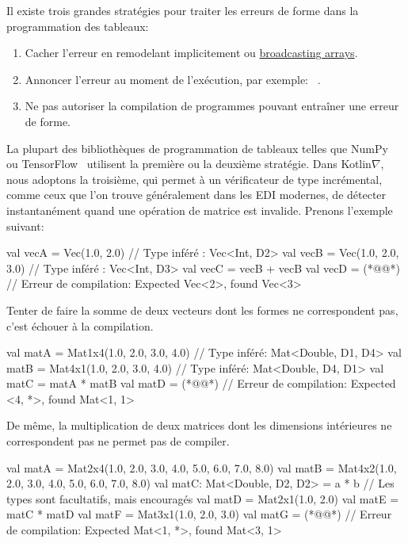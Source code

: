 \noindent Il existe trois grandes stratégies pour traiter les erreurs de forme dans la programmation des tableaux:
%
\begin{enumerate}
    \item Cacher l'erreur en remodelant implicitement ou \href{https://docs.scipy.org/doc/numpy-1.15.0/user/basics.broadcasting.html}{broadcasting arrays}.
    \item Annoncer l'erreur au moment de l'exécution, par exemple: ~\href{https://www.tensorflow.org/api_docs/python/tf/errors/InvalidArgumentError}{}.
    \item Ne pas autoriser la compilation de programmes pouvant entraîner une erreur de forme. \\
\end{enumerate}
%
La plupart des bibliothèques de programmation de tableaux telles que NumPy~\citep{van2011numpy} ou TensorFlow~\citep{abadi2016tensorflow} utilisent la première ou la deuxième stratégie. Dans Kotlin$\nabla$, nous adoptons la troisième, qui permet à un vérificateur de type incrémental, comme ceux que l'on trouve généralement dans les EDI modernes, de détecter instantanément quand une opération de matrice est invalide. Prenons l'exemple suivant:
%
\begin{kotlinlisting}
val vecA = Vec(1.0, 2.0)      // Type inféré : Vec<Int, D2>
val vecB = Vec(1.0, 2.0, 3.0) // Type inféré : Vec<Int, D3>
val vecC = vecB + vecB
val vecD = (*@@*) // Erreur de compilation: Expected Vec<2>, found Vec<3>
\end{kotlinlisting}
%
Tenter de faire la somme de deux vecteurs dont les formes ne correspondent pas, c'est échouer à la compilation.
%
\begin{kotlinlisting}
val matA = Mat1x4(1.0, 2.0, 3.0, 4.0) // Type inféré: Mat<Double, D1, D4>
val matB = Mat4x1(1.0, 2.0, 3.0, 4.0) // Type inféré: Mat<Double, D4, D1>
val matC = matA * matB
val matD = (*@@*) // Erreur de compilation: Expected <4, *>, found Mat<1, 1>
\end{kotlinlisting}
%
De même, la multiplication de deux matrices dont les dimensions intérieures ne correspondent pas ne permet pas de compiler.
%
\begin{kotlinlisting}
val matA = Mat2x4(1.0, 2.0, 3.0, 4.0,
                  5.0, 6.0, 7.0, 8.0)
val matB = Mat4x2(1.0, 2.0,
                  3.0, 4.0,
                  5.0, 6.0,
                  7.0, 8.0)
val matC: Mat<Double, D2, D2> = a * b // Les types sont facultatifs, mais encouragés
val matD = Mat2x1(1.0, 2.0)
val matE = matC * matD
val matF = Mat3x1(1.0, 2.0, 3.0)
val matG = (*@@*) // Erreur de compilation: Expected Mat<1, *>, found Mat<3, 1>
\end{kotlinlisting}
